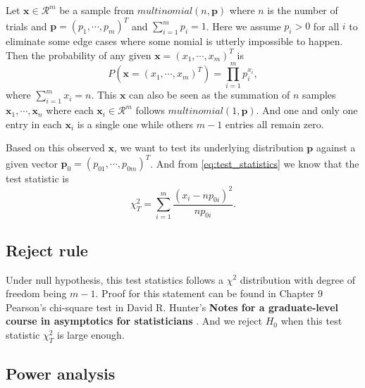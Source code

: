 \documentclass[a4paper,12pt]{article}
\begin{document}
Let $\bm{x}\in\mathcal{R}^m$ be a sample from $multinomial(n, \bm{p})$ where $n$ is the number of trials and $\bm{p} = \left(p_1, \cdots, p_m\right)^T$ and $\sum\limits_{i = 1}^mp_i = 1$. Here we assume $p_i>0$ for all $i$ to eliminate some edge cases where some nomial is utterly impossible to happen. Then the probability of any given $\bm{x} = \left(x_1, \cdots, x_m\right)^T$ is
\[
  P\left(\bm{x} = \left(x_1, \cdots, x_m\right)^T\right) = \prod\limits_{i = 1}^mp_i^{x_i}
  ,
\]
where $\sum\limits_{i = 1}^mx_i = n$. This $\bm{x}$ can also be seen as the summation of $n$ samples $\bm{x}_1, \cdots, \bm{x}_n$ where each $\bm{x}_i\in\mathcal{R}^m$ follows $multinomial(1, \bm{p})$. And one and only one entry in each $\bm{x}_i$ is a single one while others $m-1$ entries all remain zero.
\par
Based on this observed $\bm{x}$, we want to test its underlying distribution $\bm{p}$ against a given vector $\bm{p}_0 = \left(p_{01}, \cdots, p_{0m}\right)^T$. And from \eqref{eq:test_statistics} we know that the test statistic is
\begin{equation}
  \label{eq:case1_test_statistic}
  \chi^2_T = \sum\limits_{i = 1}^m
  \frac{\left(x_i - np_{0i}\right)^2}{np_{0i}}
  .
\end{equation}

\subsection{Reject rule}
\label{sec:reject-rule}

Under null hypothesis, this test statistics follows a $\chi^2$ distribution with degree of freedom being $m - 1$. Proof for this statement can be found in Chapter 9 Pearson's chi-square test in David R. Hunter's \textbf{Notes for a graduate-level course in asymptotics for statisticians} \citep{Hunter2014p-}. And we reject $H_0$ when this test statistic $\chi^2_T$ is large enough.

\subsection{Power analysis}
\label{sec:power-analysis}
\end{document}
